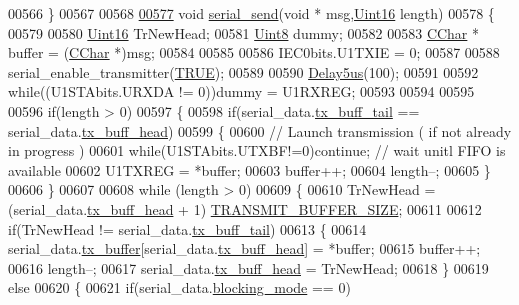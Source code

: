 \begin{DoxyCode}
{{{{{{00566 \}
00567 
00568 
\hypertarget{a00028_source_l00577}{}\hyperlink{a00028_a17f65cf9dbacdfb97cb2536ed0097ccb}{00577} \textcolor{keywordtype}{void}  \hyperlink{a00028_a17f65cf9dbacdfb97cb2536ed0097ccb}{serial\_send}(\textcolor{keywordtype}{void} * msg,\hyperlink{a00070_a59a9f6be4562c327cbfb4f7e8e18f08b}{Uint16} length)
00578 \{
00579   
00580     \hyperlink{a00070_a59a9f6be4562c327cbfb4f7e8e18f08b}{Uint16} TrNewHead;
00581     \hyperlink{a00070_af84840501dec18061d18a68c162a8fa2}{Uint8}  dummy;
00582 
00583     \hyperlink{a00070_ab151ad5c5a3b673cb8815c87ed7f706c}{CChar} * buffer = (\hyperlink{a00070_ab151ad5c5a3b673cb8815c87ed7f706c}{CChar} *)msg;
00584 
00585 
00586     IEC0bits.U1TXIE    = 0;
00587 
00588     serial\_enable\_transmitter(\hyperlink{a00038_aa8cecfc5c5c054d2875c03e77b7be15d}{TRUE});
00589 
00590     \hyperlink{a00031_a3b0017f6ec0e04a6435bba00fe325294}{Delay5us}(100);
00591     
00592     \textcolor{keywordflow}{while}((U1STAbits.URXDA != 0))dummy = U1RXREG;
00593     
00594 
00595 
00596     \textcolor{keywordflow}{if}(length > 0)
00597     \{
00598         \textcolor{keywordflow}{if}(serial\_data.\hyperlink{a00028_a6287e1447d7902b8bbc2f6359065dcbd}{tx\_buff\_tail} == serial\_data.\hyperlink{a00028_a3e2eda0a020422511de91b2bc7386083}{tx\_buff\_head})
00599         \{
00600             \textcolor{comment}{// Launch transmission ( if not already in progress )}
00601             \textcolor{keywordflow}{while}(U1STAbits.UTXBF!=0)\textcolor{keywordflow}{continue}; \textcolor{comment}{// wait unitl FIFO is available}
00602             U1TXREG = *buffer;
00603             buffer++;
00604             length--;
00605         \}
00606     \}
00607 
00608     \textcolor{keywordflow}{while} (length > 0)
00609     \{
00610         TrNewHead = (serial\_data.\hyperlink{a00028_a3e2eda0a020422511de91b2bc7386083}{tx\_buff\_head} + 1)%
      \hyperlink{a00029_aef714b16a48390956c10e8aa18d156b8}{TRANSMIT\_BUFFER\_SIZE};
00611 
00612         \textcolor{keywordflow}{if}(TrNewHead != serial\_data.\hyperlink{a00028_a6287e1447d7902b8bbc2f6359065dcbd}{tx\_buff\_tail})
00613         \{
00614             serial\_data.\hyperlink{a00028_a327864d2719b5145f0eded883fe321c5}{tx\_buffer}[serial\_data.\hyperlink{a00028_a3e2eda0a020422511de91b2bc7386083}{tx\_buff\_head}] = *buffer;
00615             buffer++;
00616             length--;
00617             serial\_data.\hyperlink{a00028_a3e2eda0a020422511de91b2bc7386083}{tx\_buff\_head} = TrNewHead;
00618         \}
00619         \textcolor{keywordflow}{else}
00620         \{
00621             \textcolor{keywordflow}{if}(serial\_data.\hyperlink{a00028_a758ac775caab1899af08024d4635f7e3}{blocking\_mode} == 0)
}}}}}}
\end{DoxyCode}
